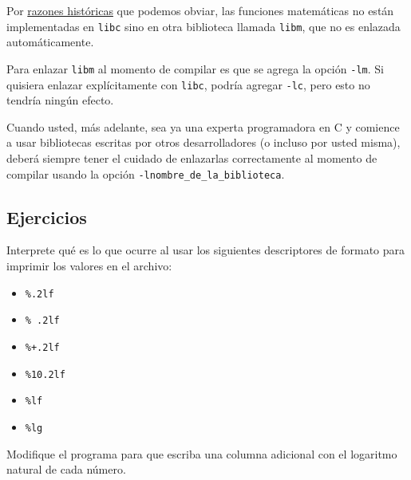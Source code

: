 Por
\href{http://stackoverflow.com/questions/1033898/why-do-you-have-to-link-the-math-library-in-c}{razones
históricas} que podemos obviar, las funciones matemáticas no están
implementadas en \lstinline!libc! sino en otra biblioteca llamada
\lstinline!libm!, que no es enlazada automáticamente.

Para enlazar \lstinline!libm! al momento de compilar es que se agrega la
opción \lstinline!-lm!. Si quisiera enlazar explícitamente con
\lstinline!libc!, podría agregar \lstinline!-lc!, pero esto no tendría
ningún efecto.

Cuando usted, más adelante, sea ya una experta programadora en C y
comience a usar bibliotecas escritas por otros desarrolladores (o
incluso por usted misma), deberá siempre tener el cuidado de enlazarlas
correctamente al momento de compilar usando la opción
\lstinline!-lnombre_de_la_biblioteca!.

\subsection{Ejercicios}

Interprete qué es lo que ocurre al usar los siguientes descriptores de
formato para imprimir los valores en el archivo:

\begin{itemize}
\item
  \lstinline!%.2lf!
\item
  \lstinline!% .2lf!
\item
  \lstinline!%+.2lf!
\item
  \lstinline!%10.2lf!
\item
  \lstinline!%lf!
\item
  \lstinline!%lg!
\end{itemize}

Modifique el programa para que escriba una columna adicional con el
logaritmo natural de cada número.
